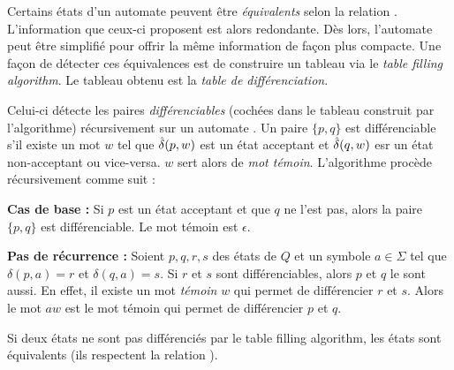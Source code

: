 Certains états d'un automate peuvent être \emph{équivalents} selon la relation \re. L'information que ceux-ci proposent est alors redondante. Dès lors, l'automate peut être simplifié pour offrir la même information de façon plus compacte. Une façon de détecter ces équivalences est de construire un tableau via le \emph{table filling algorithm}. Le tableau obtenu est la \emph{table de différenciation}.

Celui-ci détecte les paires \emph{différenciables} (cochées dans le tableau construit par l'algorithme) récursivement sur un automate \automaton. Un paire $\{p,q\}$ est différenciable s'il existe un mot $w$ tel que $\hat{\delta}(p,w)$ est un état acceptant et $\hat{\delta}(q,w)$ esr un état non-acceptant ou vice-versa. $w$ sert alors de \emph{mot témoin}. L'algorithme procède récursivement comme suit :

\textbf{Cas de base :} Si $p$ est un état acceptant et que $q$ ne l'est pas, alors la paire $\{p,q\}$ est différenciable. Le mot témoin est $\epsilon$.

\textbf{Pas de récurrence : } Soient $p,q,r,s$ des états de $Q$ et un symbole $a \in \Sigma$ tel que $\delta(p,a)=r$ et $\delta(q,a)=s$. Si $r$ et $s$ sont différenciables, alors $p$ et $q$ le sont aussi. En effet, il existe un mot \emph{témoin} $w$ qui permet de différencier $r$ et $s$. Alors le mot $aw$ est le mot témoin qui permet de différencier $p$ et $q$.

\begin{theorem}
 Si deux états ne sont pas différenciés par le table filling algorithm, les états sont équivalents (ils respectent la relation \re).
\end{theorem}

